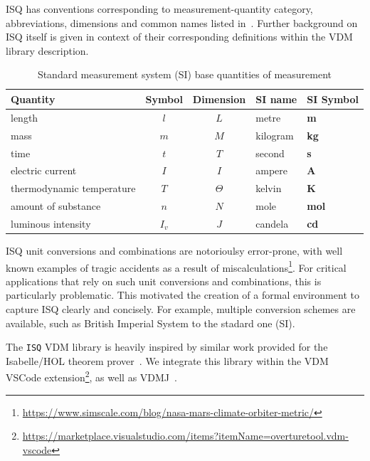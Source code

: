 \documentclass[runningheads,a4paper]{llncs}
\begin{document}
\gls{ISQ} has conventions corresponding to measurement-quantity category, abbreviations, dimensions and common names listed in~. Further background on ISQ itself is given in context of their corresponding definitions within the VDM library description.  
%
\begin{table}[htbp]
    \centering
    \begin{tabular}{lccll}
        \toprule 
        \textbf{Quantity}         & \textbf{Symbol}& \textbf{Dimension}  & \textbf{SI name} & \textbf{SI Symbol}  \\ \hline 
        length                    & \(l\)          & \(L\)        &  metre	   & \textbf{m}   \\ \midrule
        mass                      & \(m\)	       & \(M\)	      &  kilogram  & \textbf{kg}  \\ \midrule
        time                      & \(t\)          & \(T\)        &  second    & \textbf{s}   \\ \midrule 
        electric current          & \(I\)	       & \(I\)	      &  ampere    & \textbf{A}	  \\ \midrule 
        thermodynamic temperature & \(T\)	       & \(\Theta\)   &  kelvin    & \textbf{K}	  \\ \midrule
        amount of substance       & \(n\)          & \(N\)        &  mole      & \textbf{mol} \\ \midrule
        luminous intensity        & \(I_v\)	       & \(J\)	      &  candela   & \textbf{cd}  \\
        \bottomrule
    \end{tabular}
    \caption{Standard measurement system (SI) base quantities of measurement}\label{tbl:SI}
\end{table} 

\gls{ISQ} unit conversions and combinations are notorioulsy error-prone, with well known examples of tragic accidents as a result of miscalculations\footnote{\url{https://www.simscale.com/blog/nasa-mars-climate-orbiter-metric/}}. For critical applications that rely on such unit conversions and combinations, this is particularly problematic. This motivated the creation of a formal environment to capture ISQ clearly and concisely. For example, multiple conversion schemes are available, such as British Imperial System to the stadard one (SI).       

The \texttt{ISQ} VDM library is heavily inspired by similar work provided for the Isabelle/HOL theorem prover~\cite{Physical_Quantities-AFP}. We integrate this library within the VDM VSCode extension\footnote{\url{https://marketplace.visualstudio.com/items?itemName=overturetool.vdm-vscode}}, as well as VDMJ~\cite{Battle09}.
\end{document}
